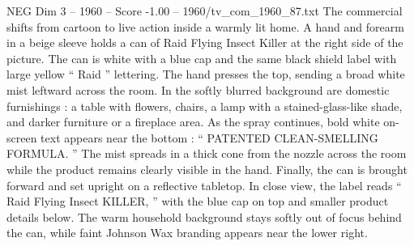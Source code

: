 \begin{textsample}{NEG Dim 3 – 1960 – Score -1.00 – 1960/tv\_com\_1960\_87.txt}
The commercial shifts from cartoon to live action inside a warmly lit home.
A hand and forearm in a beige sleeve holds a can of Raid Flying Insect Killer at the right side of the picture.
The can is white with a blue cap and the same black shield label with large yellow “ Raid ” lettering.
The hand presses the top, sending a broad white mist leftward across the room.
In the softly blurred background are domestic furnishings : a table with flowers, chairs, a lamp with a stained-glass-like shade, and darker furniture or a fireplace area.
As the spray continues, bold white on-screen text appears near the bottom : “ PATENTED CLEAN-SMELLING FORMULA. ” The mist spreads in a thick cone from the nozzle across the room while the product remains clearly visible in the hand.
Finally, the can is brought forward and set upright on a reflective tabletop.
In close view, the label reads “ Raid Flying Insect KILLER, ” with the blue cap on top and smaller product details below.
The warm household background stays softly out of focus behind the can, while faint Johnson Wax branding appears near the lower right.

\end{textsample}
